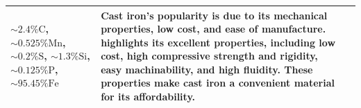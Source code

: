 \documentclass[../main.tex]{subfiles}
\begin{document}
\begin{table}[h!]
\begin{center}
\begin{tabularx}{\textwidth}{
				| >{\RaggedRight\arraybackslash}X
				| >{\Centering\arraybackslash}X
				| >{\RaggedRight\arraybackslash}X |}
			$\sim2.4\%\mathrm{C}$, $\sim0.525\%\mathrm{Mn}$, $\sim0.2\%\mathrm{S}$, $\sim1.3\%\mathrm{Si}$, $\sim0.125\%\mathrm{P}$, $\sim95.45\%\mathrm{Fe}$ \parencite{castironcomp}                                                                                                                                                                  &
			Cast iron's popularity is due to its mechanical properties, low cost, and ease of manufacture. \textcite{engtextbookcastiron} highlights its excellent properties, including low cost, high compressive strength and rigidity, easy machinability, and high fluidity. These properties make cast iron a convenient material for its affordability.                                                                        \\
			\hline
		\end{tabularx}
	\end{center}
\end{table}
\newpage
\end{document}
